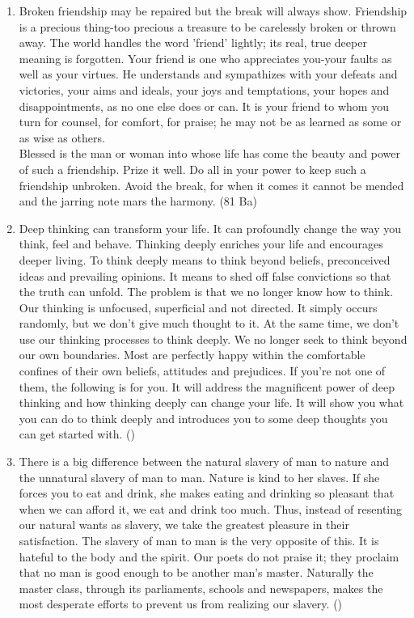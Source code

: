 \documentclass[12pt]{article}
\begin{document}
\begin{enumerate}
    \item Broken friendship may be repaired but the break will always show. Friendship is a precious thing-too precious a treasure to be carelessly broken or thrown away. The world handles the word 'friend' lightly; its real, true deeper meaning is forgotten. Your friend is one who appreciates you-your faults as well as your virtues. He understands and sympathizes with your defeats and victories, your aims and ideals, your joys and temptations, your hopes and disappointments, as no one else does or can. It is your friend to whom you turn for counsel, for comfort, for praise; he may not be as learned as some or as wise as others.\\
      Blessed is the man or woman into whose life has come the beauty and power of such a friendship. Prize it well. Do all in your power to keep such a friendship unbroken. Avoid the break, for when it comes it cannot be mended and the jarring note mars the harmony. \hfill (81 Ba)

    \item Deep thinking can transform your life. It can profoundly change the way you think, feel and behave. Thinking deeply enriches your life and encourages deeper living. To think deeply means to think beyond beliefs, preconceived ideas and prevailing opinions. It means to shed off false convictions so that the truth can unfold. The problem is that we no longer know how to think. Our thinking is unfocused, superficial and not directed. It simply occurs randomly, but we don't give much thought to it. At the same time, we don't use our thinking processes to think deeply. We no longer seek to think beyond our own boundaries. Most are perfectly happy within the comfortable confines of their own beliefs, attitudes and prejudices. If you're not one of them, the following is for you. It will address the magnificent power of deep thinking and how thinking deeply can change your life. It will show you what you can do to think deeply and introduces you to some deep thoughts you can get started with. \hfill ()

    \item There is a big difference between the natural slavery of man to nature and the unnatural slavery of man to man. Nature is kind to her slaves. If she forces you to eat and drink, she makes eating and drinking so pleasant that when we can afford it, we eat and drink too much. Thus, instead of resenting our natural wants as slavery, we take the greatest pleasure in their satisfaction. The slavery of man to man is the very opposite of this. It is hateful to the body and the spirit. Our poets do not praise it; they proclaim that no man is good enough to be another man's master. Naturally the master class, through its parliaments, schools and newspapers, makes the most desperate efforts to prevent us from realizing our slavery. \hfill ()


\end{enumerate}
\end{document}
